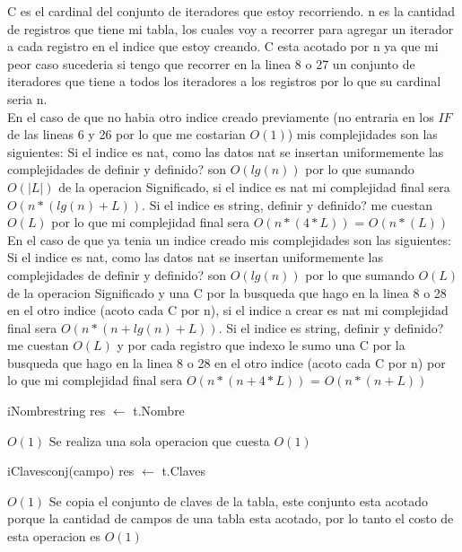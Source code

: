 \begin{Algoritmos}
   {C es el cardinal del conjunto de iteradores que estoy recorriendo. n es la cantidad de registros que tiene mi tabla, los cuales voy a recorrer para agregar un iterador a cada registro en el indice que estoy creando. C esta acotado por n ya que mi peor caso sucederia si tengo que recorrer en la linea 8 o 27 un conjunto de iteradores que tiene a todos los iteradores a los registros por lo que su cardinal seria n.  \\ En el caso de que no habia otro indice creado previamente (no entraria en los $IF$ de las lineas 6 y 26 por lo que me costarian $O(1)$) mis complejidades son las siguientes: Si el indice es nat, como las datos nat se insertan uniformemente las complejidades de definir y definido? son $O(lg(n))$ por lo que sumando $O(|L|)$ de la operacion Significado, si el indice es nat mi complejidad final sera $O(n*(lg(n) + L))$. Si el indice es string, definir y definido? me cuestan $O(L)$ por lo que mi complejidad final sera $O(n*(4*L))$ = $O(n*(L))$ \\ En el caso de que ya tenia un indice creado mis complejidades son las siguientes: Si el indice es nat, como las datos nat se insertan uniformemente las complejidades de definir y definido? son $O(lg(n))$ por lo que sumando $O(L)$ de la operacion Significado y una C por la busqueda que hago en la linea 8 o 28 en el otro indice (acoto cada C por n), si el indice a crear es nat mi complejidad final sera $O(n*(n + lg(n) + L))$. Si el indice es string, definir y definido? me cuestan $O(L)$ y por cada registro que indexo le sumo una C por la busqueda que hago en la linea 8 o 28 en el otro indice (acoto cada C por n) por lo que mi complejidad final sera $O(n*(n + 4*L))$ = $O(n*(n + L))$} %
  
  
\begin{algoritmo}{iNombre}{}{string}
    res $\leftarrow$ t.Nombre 
\end{algoritmo}
  \datosAlgoritmo{} %
  {} %
  {} %
  {$O(1)$} %
  {Se realiza una sola operacion que cuesta $O(1)$} %

  \begin{algoritmo}{iClaves}{}{conj(campo)}
    res $\leftarrow$ t.Claves 
  \end{algoritmo}
  \datosAlgoritmo{} %
  {} %
  {} %
  {$O(1)$} %
 {Se copia el conjunto de claves de la tabla, este conjunto esta acotado porque la cantidad de campos de una tabla esta acotado, por lo tanto el costo de esta operacion es $O(1)$} %
  

\end{Algoritmos}
